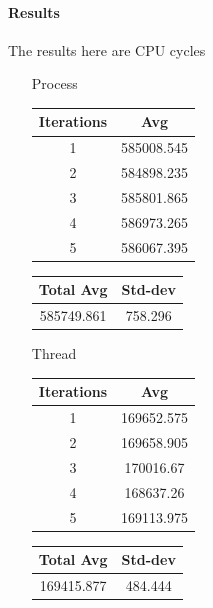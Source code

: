 \paragraph{Results}

The results here are CPU cycles

\begin{enumerate}
    \item [Process]
        \begin{center}
            \begin{tabular}{||c c||} 
                 \hline
                 Iterations & Avg \\ [0.5ex] 
                 \hline\hline
                 1 & 585008.545 \\ 
                 \hline
                 2 & 584898.235  \\ 
                 \hline
                 3 & 585801.865 \\ 
                 \hline
                 4 & 586973.265 \\ 
                 \hline
                 5 & 586067.395  \\ 
                 \hline
                 \hline
            \end{tabular} 
            \begin{tabular}{||c c||} 
                 \hline
                 Total Avg & Std-dev \\ [0.5ex] 
                 \hline\hline
                 585749.861 & 758.296 \\ 
                 \hline
                \hline
            \end{tabular}
        \end{center}
    \item [Thread]
        \begin{center}
            \begin{tabular}{||c c||} 
                 \hline
                 Iterations & Avg \\ [0.5ex] 
                 \hline\hline
                 1 & 169652.575 \\ 
                 \hline
                 2 & 169658.905  \\ 
                 \hline
                 3 & 170016.67 \\ 
                 \hline
                 4 & 168637.26 \\ 
                 \hline
                 5 & 169113.975  \\ 
                 \hline
                 \hline
            \end{tabular} 
            \begin{tabular}{||c c||} 
                 \hline
                 Total Avg & Std-dev \\ [0.5ex] 
                 \hline\hline
                 169415.877 & 484.444 \\ 
                 \hline
                \hline
            \end{tabular}
        \end{center}
\end{enumerate}

